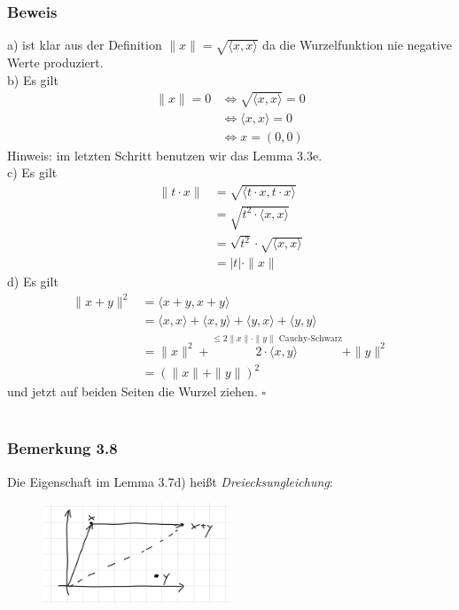 \documentclass{article}
\begin{document}
\subsubsection*{Beweis}
a) ist klar aus der Definition $\|x\| = \sqrt{\langle x,x \rangle}$ da die Wurzelfunktion nie negative Werte produziert. \\
b) Es gilt \\
\begin{align*}
    \|x\| = 0 &\Leftrightarrow \sqrt{\langle x,x \rangle} = 0 \\
    &\Leftrightarrow \langle x,x \rangle = 0 \\
    &\Leftrightarrow x = (0,0)
\end{align*}
Hinweis: im letzten Schritt benutzen wir das Lemma 3.3e. \\
c) Es gilt \\
\begin{align*}
    \|t \cdot x\| &= \sqrt{\langle t \cdot x, t \cdot x \rangle} \\
    &= \sqrt{t^2 \cdot \langle x,x \rangle} \\
    &= \sqrt{t^2} \cdot \sqrt{\langle x,x \rangle} \\
    &= |t| \cdot \|x\|
\end{align*}
d) Es gilt \\
\begin{align*}
    \|x+y\|^2 &= \langle x+y, x+y \rangle \\
    &= \langle x,x \rangle + \langle x,y \rangle + \langle y,x \rangle + \langle y,y \rangle \\
    &= \|x\|^2 + \overset{\text{$\leq 2 \|x\| \cdot \|y\|$ Cauchy-Schwarz}}{2 \cdot \langle x,y \rangle} + \|y\|^2 \\
    &= (\|x\| + \|y\|)^2
\end{align*}
und jetzt auf beiden Seiten die Wurzel ziehen. $\square$ \\
\\
\subsubsection*{Bemerkung 3.8}
Die Eigenschaft im Lemma 3.7d) heißt \textit{Dreiecksungleichung}: \\

\begin{figure}[h]
    \centering
    \includegraphics[width=0.5\textwidth]{Images/3.8.jpeg}
    \caption{}
\end{figure}
\end{document}

